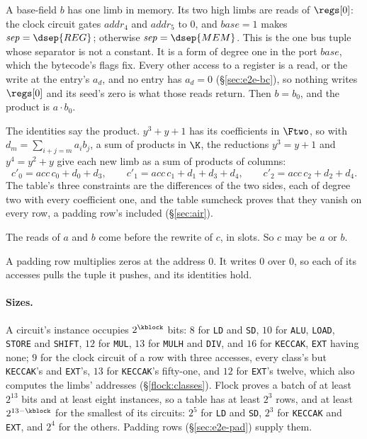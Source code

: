 A base-field $b$ has one limb in memory. Its two high limbs are reads of $\regs[0]$: the clock circuit gates $\mathit{addr}_4$ and $\mathit{addr}_5$ to $0$, and $\mathit{base}=1$ makes $\mathit{sep}=\dsep{REG}$; otherwise $\mathit{sep}=\dsep{MEM}$. This is the one bus tuple whose separator is not a constant. It is a form of degree one in the port $\mathit{base}$, which the bytecode's flags fix. Every other access to a register is a read, or the write at the entry's $a_d$, and no entry has $a_d=0$ (\S\ref{sec:e2e-bc}), so nothing writes $\regs[0]$ and its seed's zero is what those reads return. Then $b=b_0$, and the product is $a\cdot b_0$.

The identities say the product. $y^3+y+1$ has its coefficients in $\Ftwo$, so with $d_m=\sum_{i+j=m}a_ib_j$, a sum of products in $\K$, the reductions $y^3=y+1$ and $y^4=y^2+y$ give each new limb as a sum of products of columns:
\[
  c'_0=\mathit{acc}\,c_0+d_0+d_3,\qquad c'_1=\mathit{acc}\,c_1+d_1+d_3+d_4,\qquad c'_2=\mathit{acc}\,c_2+d_2+d_4.
\]
The table's three constraints are the differences of the two sides, each of degree two with every coefficient one, and the table sumcheck proves that they vanish on every row, a padding row's included (\S\ref{sec:air}).

The reads of $a$ and $b$ come before the rewrite of $c$, in slots. So $c$ may be $a$ or $b$.

A padding row multiplies zeros at the address $0$. It writes $0$ over $0$, so each of its accesses pulls the tuple it pushes, and its identities hold.

\paragraph{Sizes.} A circuit's instance occupies $2^{\kblock}$ bits: $8$ for \texttt{LD} and \texttt{SD}, $10$ for \texttt{ALU}, \texttt{LOAD}, \texttt{STORE} and \texttt{SHIFT}, $12$ for \texttt{MUL}, $13$ for \texttt{MULH} and \texttt{DIV}, and $16$ for \texttt{KECCAK}, \texttt{EXT} having none; $9$ for the clock circuit of a row with three accesses, every class's but \texttt{KECCAK}'s and \texttt{EXT}'s, $13$ for \texttt{KECCAK}'s fifty-one, and $12$ for \texttt{EXT}'s twelve, which also computes the limbs' addresses (\S\ref{flock:classes}). Flock proves a batch of at least $2^{13}$ bits and at least eight instances, so a table has at least $2^{3}$ rows, and at least $2^{13-\kblock}$ for the smallest of its circuits: $2^{5}$ for \texttt{LD} and \texttt{SD}, $2^{3}$ for \texttt{KECCAK} and \texttt{EXT}, and $2^{4}$ for the others. Padding rows (\S\ref{sec:e2e-pad}) supply them.
